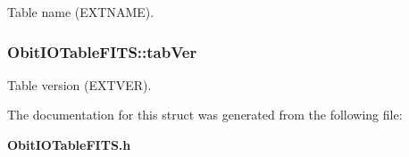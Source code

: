 Table name (EXTNAME). 

\subsubsection{ {\bf Obit\-IOTable\-FITS::tab\-Ver}}\label{structObitIOTableFITS_o10}


Table version (EXTVER). 



The documentation for this struct was generated from the following file:\begin{CompactItemize}
\item 
{\bf Obit\-IOTable\-FITS.h}\end{CompactItemize}
